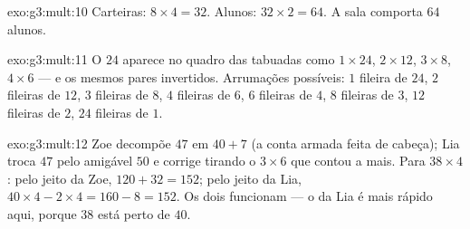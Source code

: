 \begin{solution}{exo:g3:mult:10}
Carteiras: $8 \times 4 = 32$. Alunos: $32 \times 2 = 64$. A sala
comporta $64$ alunos.
\end{solution}

\begin{solution}{exo:g3:mult:11}
O $24$ aparece no quadro das tabuadas como $1 \times 24$,
$2 \times 12$, $3 \times 8$, $4 \times 6$ --- e os mesmos pares
invertidos. Arrumações possíveis: $1$ fileira de $24$, $2$ fileiras
de $12$, $3$ fileiras de $8$, $4$ fileiras de $6$, $6$ fileiras de
$4$, $8$ fileiras de $3$, $12$ fileiras de $2$, $24$ fileiras de
$1$.
\end{solution}

\begin{solution}{exo:g3:mult:12}
Zoe decompõe $47$ em $40 + 7$ (a conta armada feita de cabeça); Lia
troca $47$ pelo amigável $50$ e corrige tirando o $3 \times 6$ que
contou a mais. Para $38 \times 4$: pelo jeito da Zoe,
$120 + 32 = 152$; pelo jeito da Lia,
$40 \times 4 - 2 \times 4 = 160 - 8 = 152$. Os dois funcionam --- o
da Lia é mais rápido aqui, porque $38$ está perto de $40$.
\end{solution}
